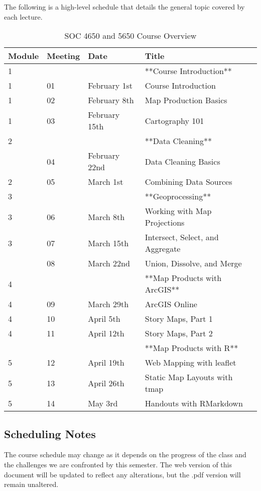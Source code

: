 \documentclass[
]{book}
\begin{document}
The following is a high-level schedule that details the general topic covered by each lecture.

\begin{table}

\caption{\label{tab:unnamed-chunk-1}SOC 4650 and 5650 Course Overview}
\centering
\begin{tabular}[t]{llll}
\toprule
Module & Meeting & Date & Title\\
\midrule
1 &  &  & **Course Introduction**\\
1 & 01 & February 1st & Course Introduction\\
1 & 02 & February 8th & Map Production Basics\\
1 & 03 & February 15th & Cartography 101\\
2 &  &  & **Data Cleaning**\\
\addlinespace
2 & 04 & February 22nd & Data Cleaning Basics\\
2 & 05 & March 1st & Combining Data Sources\\
3 &  &  & **Geoprocessing**\\
3 & 06 & March 8th & Working with Map Projections\\
3 & 07 & March 15th & Intersect, Select, and Aggregate\\
\addlinespace
3 & 08 & March 22nd & Union, Dissolve, and Merge\\
4 &  &  & **Map Products with ArcGIS**\\
4 & 09 & March 29th & ArcGIS Online\\
4 & 10 & April 5th & Story Maps, Part 1\\
4 & 11 & April 12th & Story Maps, Part 2\\
\addlinespace
5 &  &  & **Map Products with R**\\
5 & 12 & April 19th & Web Mapping with leaflet\\
5 & 13 & April 26th & Static Map Layouts with tmap\\
5 & 14 & May 3rd & Handouts with RMarkdown\\
\bottomrule
\end{tabular}
\end{table}

\hypertarget{scheduling-notes}{%
\subsection{Scheduling Notes}\label{scheduling-notes}}

The course schedule may change as it depends on the progress of the class and the challenges we are confronted by this semester. The web version of this document will be updated to reflect any alterations, but the .pdf version will remain unaltered.
\end{document}
